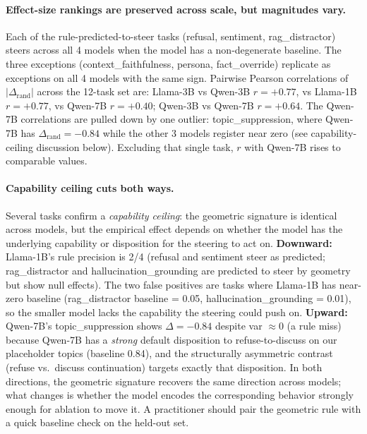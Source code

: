 \documentclass[11pt]{article}
\begin{document}
\paragraph{Effect-size rankings are preserved across scale, but
magnitudes vary.}
Each of the rule-predicted-to-steer tasks (refusal, sentiment,
rag\_distractor) steers across all 4 models when the model has a
non-degenerate baseline. The three exceptions (context\_faithfulness,
persona, fact\_override) replicate as exceptions on all 4 models
with the same sign. Pairwise Pearson correlations of
$|\Delta_{\text{rand}}|$ across the 12-task set are: Llama-3B vs
Qwen-3B $r = +0.77$, vs Llama-1B $r = +0.77$, vs Qwen-7B $r = +0.40$;
Qwen-3B vs Qwen-7B $r = +0.64$. The Qwen-7B correlations are pulled
down by one outlier: topic\_suppression, where Qwen-7B has
$\Delta_{\text{rand}} = -0.84$ while the other 3 models register
near zero (see capability-ceiling discussion below). Excluding
that single task, $r$ with Qwen-7B rises to comparable values.

\paragraph{Capability ceiling cuts both ways.}
Several tasks confirm a \emph{capability ceiling}: the geometric
signature is identical across models, but the empirical effect
depends on whether the model has the underlying capability or
disposition for the steering to act on.
\textbf{Downward:} Llama-1B's rule precision is 2/4 (refusal and
sentiment steer as predicted; rag\_distractor and
hallucination\_grounding are predicted to steer by geometry but
show null effects). The two false positives are tasks where
Llama-1B has near-zero baseline (rag\_distractor baseline = 0.05,
hallucination\_grounding = 0.01), so the smaller model lacks the
capability the steering could push on.
\textbf{Upward:} Qwen-7B's topic\_suppression shows $\Delta = -0.84$
despite var $\approx 0$ (a rule miss) because Qwen-7B has a
\emph{strong} default disposition to refuse-to-discuss on our
placeholder topics (baseline 0.84), and the structurally asymmetric
contrast (refuse vs.~discuss continuation) targets exactly that
disposition. In both directions, the geometric signature recovers
the same direction across models; what changes is whether the
model encodes the corresponding behavior strongly enough for
ablation to move it. A practitioner should pair the geometric
rule with a quick baseline check on the held-out set.

\end{document}
